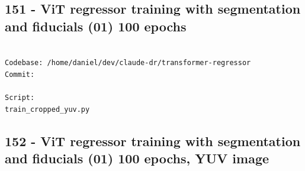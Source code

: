 \subsection{151 - ViT regressor training with segmentation and fiducials (01) 100 epochs}
\label{app_res:151}

\begin{verbatim}

Codebase: /home/daniel/dev/claude-dr/transformer-regressor 
Commit: 

Script:
train_cropped_yuv.py

\end{verbatim}



\subsection{152 - ViT regressor training with segmentation and fiducials (01) 100 epochs, YUV image}
\label{app_res:152}

